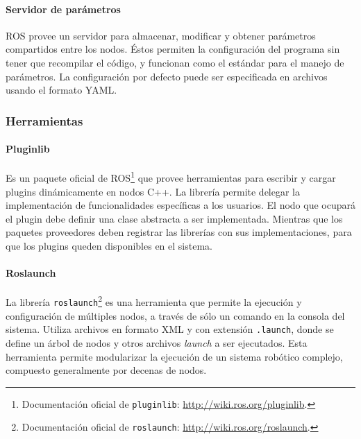\paragraph{Servidor de parámetros} ROS provee un servidor para almacenar, modificar y obtener parámetros compartidos entre los nodos. Éstos permiten la configuración del programa sin tener que recompilar el código, y funcionan como el estándar para el manejo de parámetros. La configuración por defecto puede ser especificada en archivos usando el formato YAML.


\subsubsection{Herramientas}

\paragraph{Pluginlib} Es un paquete oficial de ROS\footnote{Documentación oficial de \texttt{pluginlib}: \url{http://wiki.ros.org/pluginlib}.} que provee herramientas para escribir y cargar plugins dinámicamente en nodos C++. La librería permite delegar la implementación de funcionalidades específicas a los usuarios. El nodo que ocupará el plugin debe definir una clase abstracta a ser implementada. Mientras que los paquetes proveedores deben registrar las librerías con sus implementaciones, para que los plugins queden disponibles en el sistema.

\paragraph{Roslaunch} La librería \texttt{roslaunch}\footnote{Documentación oficial de \texttt{roslaunch}: \url{http://wiki.ros.org/roslaunch}.} es una herramienta que permite la ejecución y configuración de múltiples nodos, a través de sólo un comando en la consola del sistema. Utiliza archivos en formato XML y con extensión \texttt{.launch}, donde se define un árbol de nodos y otros archivos \textit{launch} a ser ejecutados. Esta herramienta permite modularizar la ejecución de un sistema robótico complejo, compuesto generalmente por decenas de nodos.



